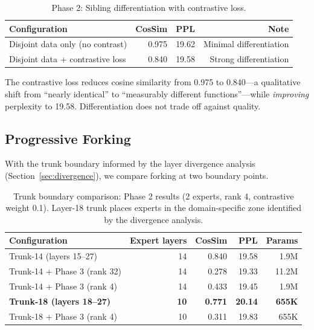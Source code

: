 \documentclass{article}
\begin{document}
\begin{table}[h]
\centering
\caption{Phase 2: Sibling differentiation with contrastive loss.}
\label{tab:phase2}
\begin{tabular}{@{}lrrr@{}}
\toprule
Configuration & CosSim & PPL & Note \\
\midrule
Disjoint data only (no contrast) & 0.975 & 19.62 & Minimal differentiation \\
Disjoint data + contrastive loss & 0.840 & 19.58 & Strong differentiation \\
\bottomrule
\end{tabular}
\end{table}

The contrastive loss reduces cosine similarity from 0.975 to 0.840---a
qualitative shift from ``nearly identical'' to ``measurably different
functions''---while \emph{improving} perplexity to 19.58. Differentiation does
not trade off against quality.

\subsection{Progressive Forking}
\label{sec:forking}

With the trunk boundary informed by the layer divergence analysis
(Section~\ref{sec:divergence}), we compare forking at two boundary points.

\begin{table}[h]
\centering
\caption{Trunk boundary comparison: Phase 2 results (2 experts, rank 4,
contrastive weight 0.1). Layer-18 trunk places experts in the domain-specific
zone identified by the divergence analysis.}
\label{tab:trunk-comparison}
\begin{tabular}{@{}lrrrr@{}}
\toprule
Configuration & Expert layers & CosSim & PPL & Params \\
\midrule
Trunk-14 (layers 15--27) & 14 & 0.840 & 19.58 & 1.9M \\
Trunk-14 + Phase 3 (rank 32) & 14 & 0.278 & 19.33 & 11.2M \\
Trunk-14 + Phase 3 (rank 4) & 14 & 0.433 & 19.45 & 1.9M \\
\textbf{Trunk-18 (layers 18--27)} & \textbf{10} & \textbf{0.771} & \textbf{20.14} & \textbf{655K} \\
Trunk-18 + Phase 3 (rank 4) & 10 & 0.311 & 19.83 & 655K \\
\bottomrule
\end{tabular}
\end{table}
\end{document}
